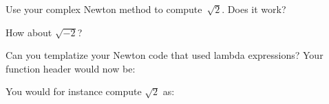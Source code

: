 \begin{exercise}
  \label{ex:newt-template2}
  Use your complex Newton method to compute~$\sqrt 2$.
  Does it work?

  How about $\sqrt{-2}$?
\end{exercise}

\begin{exercise}
  \label{ex:newt-lambda-template}
  Can you templatize your Newton code that used lambda expressions?
  Your function header would now be:

  You would for instance compute $\sqrt 2$ as:
\end{exercise}


